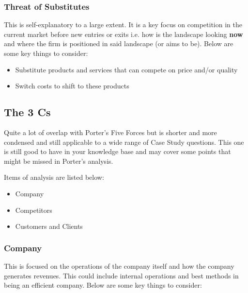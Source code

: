 \documentclass[a4paper]{article}
\begin{document}
{\subsubsection{Threat of Substitutes}
This is self-explanatory to a large extent. It is a key focus on competition in the current market before new entries or exits i.e. how is the landscape looking \textbf{now} and where the firm is positioned in said landscape (or aims to be). Below are some key things to consider:

\begin{itemize}
	\item Substitute products and services that can compete on price and/or quality
	\item Switch costs to shift to these products
\end{itemize}

\subsection{The 3 Cs}
Quite a lot of overlap with Porter's Five Forces but is shorter and more condensed and still applicable to a wide range of Case Study questions. This one is still good to have in your knowledge base and may cover some points that might be missed in Porter's analysis.

\vspace{5pt}
\noindent Items of analysis are listed below:
\begin{itemize}
	\item Company
	\item Competitors
	\item Customers and Clients
\end{itemize}

\subsubsection{Company}
This is focused on the operations of the company itself and how the company generates revenues. This could include internal operations and best methods in being an efficient company. Below are some key things to consider:

}
\end{document}
